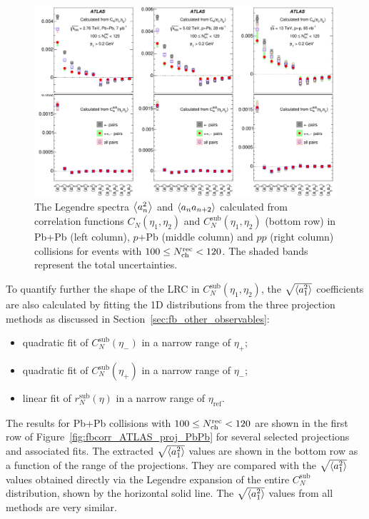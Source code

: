 \begin{figure}[H]
\centering
\includegraphics[width=.95\linewidth]{figs/chapter_fbcorr/ATLAS_coef.pdf}
\caption{The Legendre spectra $\left\langle a_n^2\right\rangle$ and $\left\langle a_n a_{n+2}\right\rangle$ calculated from correlation functions $C_N(\eta_1, \eta_2)$ and $C_N^\text{sub}(\eta_1, \eta_2)$ (bottom row) in Pb+Pb (left column), $p$+Pb (middle column) and $pp$ (right column) collisions for events with $100 \le N_\text{ch}^\text{rec} < 120$. The shaded bands represent the total uncertainties.}
\label{fig:fbcorr_ATLAS_coef}
\end{figure}

To quantify further the shape of the LRC in $C_N^\text{sub}(\eta_1, \eta_2)$, the $\sqrt{\left\langle a_1^2\right\rangle}$ coefficients are also calculated by fitting the 1D distributions from the three projection methods as discussed in Section~\ref{sec:fb_other_observables}:
\begin{itemize}
\item quadratic fit of $C_N^\text{sub}(\eta_-)$ in a narrow range of $\eta_+$;
\item quadratic fit of $C_N^\text{sub}(\eta_+)$ in a narrow range of $\eta_-$;
\item linear fit of $r_N^\text{sub}(\eta)$ in a narrow range of $\eta_\text{ref}$.
\end{itemize}
The results for Pb+Pb collisions with $100 \le N_\text{ch}^\text{rec} < 120$ are shown in the first row of Figure~\ref{fig:fbcorr_ATLAS_proj_PbPb} for several selected projections and associated fits. The extracted $\sqrt{\left\langle a_1^2\right\rangle}$ values are shown in the bottom row as a function of the range of the projections. They are compared with the $\sqrt{\left\langle a_1^2\right\rangle}$ values obtained directly via the Legendre expansion of the entire $C_N^\text{sub}$ distribution, shown by the horizontal solid line. The $\sqrt{\left\langle a_1^2\right\rangle}$ values from all methods are very similar.


